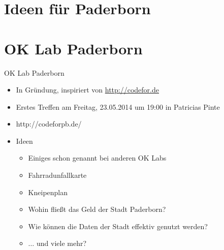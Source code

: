 \section{Ideen für Paderborn}

\section{OK Lab Paderborn}
\begin{frame}{OK Lab Paderborn}
 \begin{itemize}
  \item In Gründung, inspiriert von \url{http://codefor.de}
  \item Erstes Treffen am Freitag, 23.05.2014 um 19:00 in Patricias Pinte
  \item http://codeforpb.de/
  \item Ideen
  \begin{itemize}
   \item Einiges schon genannt bei anderen OK Labs
   \item Fahrradunfallkarte
   \item Kneipenplan
   \item Wohin fließt das Geld der Stadt Paderborn?
   \item Wie können die Daten der Stadt effektiv genutzt werden?
   \item $\dots$ und viele mehr?
  \end{itemize}
 \end{itemize}
\end{frame}
